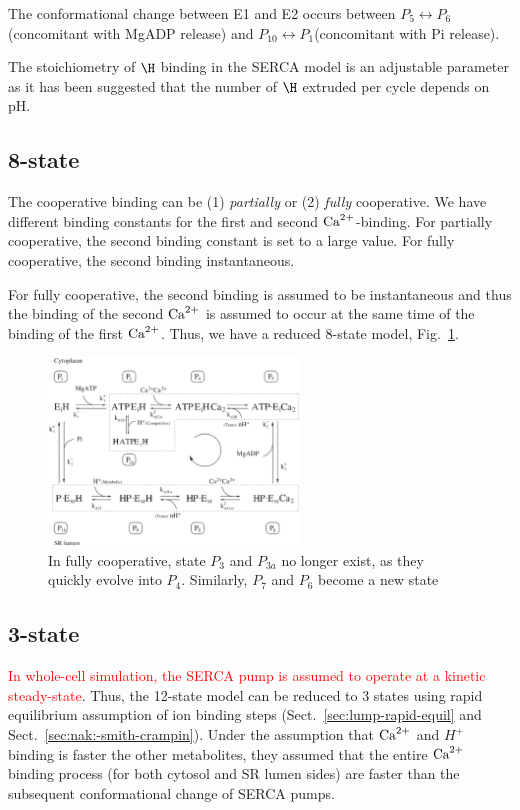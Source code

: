The conformational change between E1 and E2 occurs between $P_5 \leftrightarrow P_6$
(concomitant with MgADP release) and $P_{10} \leftrightarrow P_1$(concomitant with
Pi release). 

The stoichiometry of $\H$  binding in the SERCA model is an adjustable
parameter as it has been suggested that the number of $\H$ extruded
per cycle depends on pH.

\subsection{8-state}
\label{sec:8-state}

\begin{framed}
  The cooperative binding can be (1) {\it partially} or (2)
  {\it fully} cooperative. We have different binding constants for
  the first and second ${\text{Ca}^{2+}}$-binding. For partially cooperative, the
  second binding constant is set to a large value. For fully
  cooperative, the second binding instantaneous. 
\end{framed}

For fully cooperative, the second binding is assumed to be
instantaneous and thus the binding of the second ${\text{Ca}^{2+}}$ is assumed to
occur at the same time of the binding of the first ${\text{Ca}^{2+}}$. Thus, we
have a reduced 8-state model, Fig.~\ref{fig:Tran_8state}.

\begin{figure}[hbt]
  \centerline{\includegraphics[height=5cm,
    angle=0]{./images/Tran_8state.eps}}
\caption{In fully cooperative, state $P_3$ and $P_{3a}$ no longer
  exist, as they quickly evolve into $P_4$. Similarly, $P_7$ and $P_6$
become a new state}
\label{fig:Tran_8state}
\end{figure}

\subsection{3-state}
\label{sec:3-state}

\textcolor{red}{In whole-cell simulation, the SERCA pump is assumed to
  operate at a kinetic steady-state}.
Thus, the 12-state model can be reduced to 3 states using rapid
equilibrium assumption of ion binding steps
(Sect.~\ref{sec:lump-rapid-equil} and
Sect.~\ref{sec:nak:-smith-crampin}).  Under the assumption that ${\text{Ca}^{2+}}$
and $H^+$ binding is faster the other metabolites, they assumed that
the entire ${\text{Ca}^{2+}}$ binding process (for both cytosol and SR lumen sides)
are faster than the subsequent conformational change of SERCA pumps.

